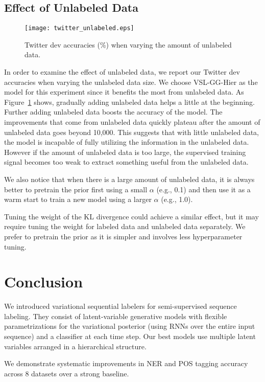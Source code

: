 \documentclass[11pt,a4paper]{article}
\newcommand{\vsmgghier}{VSL-GG-Hier\xspace}
\begin{document}
\subsection{Effect of Unlabeled Data}

\begin{figure}[t]
    \centering
    \texttt{[image: twitter\_unlabeled.eps]}
\caption{Twitter dev accuracies (\%) when varying the amount of unlabeled data.}
\label{fig:unlabeled}
\end{figure}
In order to examine the effect of unlabeled data, we report our Twitter dev accuracies when varying the unlabeled data size. We choose \vsmgghier as the model for this experiment since it benefits the most from unlabeled data. As Figure~\ref{fig:unlabeled} shows, gradually adding unlabeled data helps a little at the beginning. Further adding unlabeled data boosts the accuracy of the model.
The improvements that come from unlabeled data quickly plateau after the amount of unlabeled data goes beyond 10,000. This suggests that with little unlabeled data, the model is incapable of fully utilizing the information in the unlabeled data. However if the amount of unlabeled data is too large, the supervised training signal becomes too weak to extract something useful from the unlabeled data.

We also notice that when there is a large amount of unlabeled data, it is always better to pretrain the prior first using a small $\alpha$ (e.g., 0.1) and then use it as a warm start to train a new model using a larger $\alpha$ (e.g., 1.0).

Tuning the weight of the KL divergence could achieve a similar effect, but it may require tuning the weight for labeled data and unlabeled data separately. We prefer to pretrain the prior as it is simpler and involves less hyperparameter tuning.

\section{Conclusion}

We introduced variational sequential labelers for semi-supervised sequence labeling. They consist of  latent-variable generative models with flexible parametrizations for the variational posterior (using RNNs over the entire input sequence) and a classifier at each time step.  Our best models use multiple latent variables arranged in a hierarchical structure.

We demonstrate systematic improvements in NER and POS tagging accuracy across 8 datasets over a strong baseline.
\end{document}
